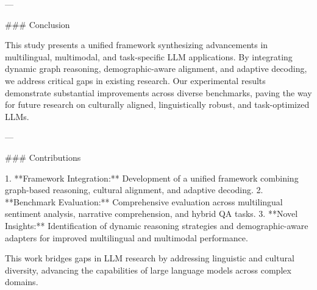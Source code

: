 ---

### Conclusion

This study presents a unified framework synthesizing advancements in multilingual, multimodal, and task-specific LLM applications. By integrating dynamic graph reasoning, demographic-aware alignment, and adaptive decoding, we address critical gaps in existing research. Our experimental results demonstrate substantial improvements across diverse benchmarks, paving the way for future research on culturally aligned, linguistically robust, and task-optimized LLMs.

---

### Contributions

1. **Framework Integration:** Development of a unified framework combining graph-based reasoning, cultural alignment, and adaptive decoding.
2. **Benchmark Evaluation:** Comprehensive evaluation across multilingual sentiment analysis, narrative comprehension, and hybrid QA tasks.
3. **Novel Insights:** Identification of dynamic reasoning strategies and demographic-aware adapters for improved multilingual and multimodal performance.

This work bridges gaps in LLM research by addressing linguistic and cultural diversity, advancing the capabilities of large language models across complex domains.